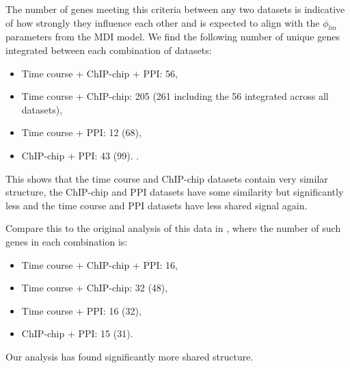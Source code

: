 \documentclass[]{article}
\begin{document}
The number of genes meeting this criteria between any two datasets is indicative of how strongly they influence each other and is expected to align with the $\phi_{lm}$ parameters from the MDI model. We find the following number of unique genes integrated between each combination of datasets:
\begin{itemize}	
	\item Time course + ChIP-chip + PPI: 56,
	\item Time course + ChIP-chip: 205 (261 including the 56 integrated across all datasets),
	\item Time course + PPI: 12 (68),
	\item ChIP-chip + PPI: 43 (99).
.
\end{itemize}
This shows that the time course  and ChIP-chip datasets contain very similar structure, the ChIP-chip and PPI datasets have some similarity but significantly less and the time course  and PPI datasets have less shared signal again. 

Compare this to the original analysis of this data in \cite{kirk2012bayesian}, where the number of such genes in each combination is:

\begin{itemize}
	\item Time course + ChIP-chip + PPI: 16,
	\item Time course + ChIP-chip: 32 (48),
	\item Time course + PPI: 16 (32),
	\item ChIP-chip + PPI: 15 (31).
\end{itemize}
Our analysis has found significantly more shared structure.

\end{document}
